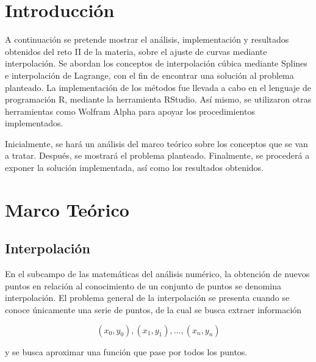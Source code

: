 \documentclass[conference]{IEEEtran}
\begin{document}

\section{Introducción}

A continuación se pretende mostrar el análisis, implementación y resultados obtenidos del reto II de la materia, sobre el ajuste de curvas mediante interpolación. Se abordan los conceptos de interpolación cúbica mediante Splines e interpolación de Lagrange, con el fin de encontrar una solución al problema planteado. La implementación de los métodos fue llevada a cabo en el lenguaje de programación R, mediante la herramienta RStudio. Así mismo, se utilizaron otras herramientas como Wolfram Alpha para apoyar los procedimientos implementados. \par

Inicialmente, se hará un análisis del marco teórico sobre los conceptos que se van a tratar. Después, se mostrará el problema planteado. Finalmente, se procederá a exponer la solución implementada, así como los resultados obtenidos. \par


\section{Marco Teórico}

\subsection{Interpolación}

En el subcampo de las matemáticas del análisis numérico, la obtención de nuevos puntos en relación al conocimiento de un conjunto de puntos se denomina interpolación. El problema general de la interpolación se presenta cuando se conoce únicamente una serie de puntos, de la cual se busca extraer información \par

\[ (x_0, y_0), (x_1, y_1), ..., (x_n, y_n) \] \par

y se busca aproximar una función que pase por todos los puntos. \par
\end{document}
